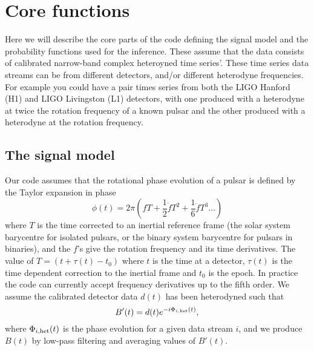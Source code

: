 \section{Core functions}

Here we will describe the core parts of the code defining the signal model and the probability functions used
for the inference. These assume that the data consists of calibrated narrow-band complex heteroyned time
series'. These time series data streams can be from different detectors, and/or different heterodyne
frequencies. For example you could have a pair times series from both the LIGO Hanford (H1) and LIGO
Livingston (L1) detectors, with one produced with a heterodyne at twice the rotation frequency of a known
pulsar and the other produced with a heterodyne at the rotation frequency.

\subsection{The signal model}

Our code assumes that the rotational phase evolution of a pulsar is defined by the Taylor expansion in phase
\begin{equation}
\phi(t) = 2\pi\left(fT + \frac{1}{2}\dot{f}T^2 + \frac{1}{6}\ddot{f}T^3  \ldots\right)
\end{equation}
where $T$ is the time corrected to an inertial reference frame (the solar system barycentre
for isolated pulsars, or the binary system barycentre for pulsars in binaries), and the $f$'s give
the rotation frequency and its time derivatives. The value of $T = (t+\tau(t)-t_0)$ where $t$ is the
time at a detector, $\tau(t)$ is the time dependent correction to the inertial frame and $t_0$ is the epoch.
In practice the code can currently accept frequency derivatives up to the fifth order. We assume the
calibrated detector data $d(t)$ has been heterodyned such that
\begin{equation}
B'(t) = d(t)e^{-i\Phi_{i,\rm het}(t)},
\end{equation}
where $\Phi_{i,\rm het}(t)$ is the phase evolution for a given data stream $i$, and we produce $B(t)$ by
low-pass filtering and averaging values of $B'(t)$.

